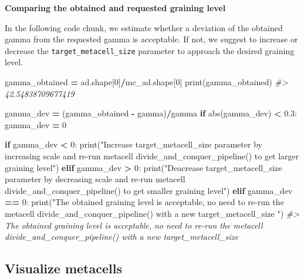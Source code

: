 \documentclass[
]{book}
\newenvironment{Shaded}{\begin{snugshade}}{\end{snugshade}}
\newcommand{\BuiltInTok}[1]{#1}
\newcommand{\CommentTok}[1]{\textcolor[rgb]{0.56,0.35,0.01}{\textit{#1}}}
\newcommand{\ControlFlowTok}[1]{\textcolor[rgb]{0.13,0.29,0.53}{\textbf{#1}}}
\newcommand{\DecValTok}[1]{\textcolor[rgb]{0.00,0.00,0.81}{#1}}
\newcommand{\FloatTok}[1]{\textcolor[rgb]{0.00,0.00,0.81}{#1}}
\newcommand{\NormalTok}[1]{#1}
\newcommand{\OperatorTok}[1]{\textcolor[rgb]{0.81,0.36,0.00}{\textbf{#1}}}
\newcommand{\StringTok}[1]{\textcolor[rgb]{0.31,0.60,0.02}{#1}}
\begin{document}
\textbf{Comparing the obtained and requested graining level}

In the following code chunk, we estimate whether a deviation of the obtained gamma from the requested gamma is acceptable. If not, we suggest to increase or decrease the \texttt{target\_metacell\_size} parameter to approach the desired graining level.

\begin{Shaded}
\begin{Highlighting}[]
\NormalTok{gamma\_obtained }\OperatorTok{=}\NormalTok{ ad.shape[}\DecValTok{0}\NormalTok{]}\OperatorTok{/}\NormalTok{mc\_ad.shape[}\DecValTok{0}\NormalTok{]}
\BuiltInTok{print}\NormalTok{(gamma\_obtained)}
\CommentTok{\#\textgreater{} 42.54838709677419}

\NormalTok{gamma\_dev }\OperatorTok{=}\NormalTok{ (gamma\_obtained }\OperatorTok{{-}}\NormalTok{ gamma)}\OperatorTok{/}\NormalTok{gamma}
\ControlFlowTok{if} \BuiltInTok{abs}\NormalTok{(gamma\_dev) }\OperatorTok{\textless{}} \FloatTok{0.3}\NormalTok{: }
\NormalTok{    gamma\_dev }\OperatorTok{=} \DecValTok{0}

\ControlFlowTok{if}\NormalTok{ gamma\_dev }\OperatorTok{\textless{}} \DecValTok{0}\NormalTok{:}
    \BuiltInTok{print}\NormalTok{(}\StringTok{"Increase \textasciigrave{}target\_metacell\_size\textasciigrave{} parameter by increasing \textasciigrave{}scale\textasciigrave{} and re{-}run metacell divide\_and\_conquer\_pipeline() to get larger graining level"}\NormalTok{)}
\ControlFlowTok{elif}\NormalTok{ gamma\_dev }\OperatorTok{\textgreater{}} \DecValTok{0}\NormalTok{:}
    \BuiltInTok{print}\NormalTok{(}\StringTok{"Deacrease \textasciigrave{}target\_metacell\_size\textasciigrave{} parameter by decreasing \textasciigrave{}scale\textasciigrave{} and re{-}run metacell divide\_and\_conquer\_pipeline() to get smaller graining level"}\NormalTok{)}
\ControlFlowTok{elif}\NormalTok{ gamma\_dev }\OperatorTok{==} \DecValTok{0}\NormalTok{:}
    \BuiltInTok{print}\NormalTok{(}\StringTok{"The obtained graining level is acceptable, no need to re{-}run the metacell divide\_and\_conquer\_pipeline() with a new \textasciigrave{}target\_metacell\_size\textasciigrave{} "}\NormalTok{)}
\CommentTok{\#\textgreater{} The obtained graining level is acceptable, no need to re{-}run the metacell divide\_and\_conquer\_pipeline() with a new \textasciigrave{}target\_metacell\_size\textasciigrave{}}
\end{Highlighting}
\end{Shaded}

\hypertarget{visualize-metacells}{%
\subsection{Visualize metacells}\label{visualize-metacells}}
\end{document}
